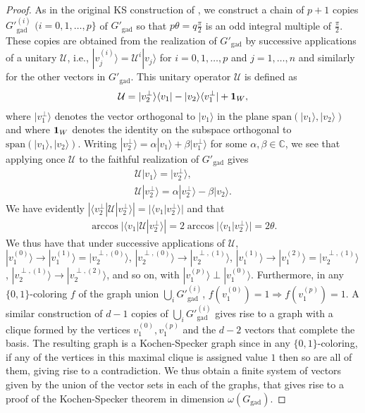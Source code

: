 \documentclass[twocolumn, a4paper, superscriptaddress,nofootinbib, accepted=2020-08-07, hyperref]{quantumarticle}
\def\textbf#1{{\bf #1}}
\begin{document}
\begin{proof}
	As in the original KS construction of \cite{KS}, we construct a chain of $p+1$ copies $G'^{(i)}_{\text{gad}}$ $(i=0,1,\ldots,p\}$ of $G'_{\text{gad}}$ so that $p \theta = q \frac{\pi}{2}$ is an odd integral multiple of $\frac{\pi}{2}$. These copies are obtained from the realization of $G'_{\text{gad}}$ by successive applications of a unitary $\mathcal{U}$, i.e., $|v_j^{(i)} \rangle = \mathcal{U}^{i} | v_j \rangle$ for $i=0,1,\ldots,p$ and $j=1,\ldots,n$ and similarly for the other vectors in $G'_{\text{gad}}$. This unitary operator $\mathcal{U}$ is defined as
	\begin{eqnarray}
	\mathcal{U} = |v_2^{\perp} \rangle \langle v_1 | - | v_2 \rangle \langle v_1^{\perp}| + \textbf{1}_W, 
	\end{eqnarray}
	where $| v_1^{\perp} \rangle$ denotes the vector orthogonal to $|v_1 \rangle$ in the plane $\text{span}(|v_1 \rangle, |v_2 \rangle)$ and where $\textbf{1}_W$ denotes the identity on the subspace orthogonal to $\text{span}(|v_1 \rangle, |v_2 \rangle)$. Writing $|v_2^{\perp} \rangle = \alpha | v_1 \rangle + \beta | v_1^{\perp} \rangle$ for some $\alpha, \beta \in \mathbb{C}$, we see that applying once $\mathcal{U}$ to the faithful realization of $G'_{\text{gad}}$ gives
	\begin{eqnarray}
	\mathcal{U} | v_1 \rangle = | v_2^{\perp} \rangle, \nonumber \\
	\mathcal{U} | v_2^{\perp} \rangle = \alpha | v_2^{\perp} \rangle - \beta | v_2 \rangle.
	\end{eqnarray}
	We have evidently $| \langle v_2^{\perp} | \mathcal{U} | v_2^{\perp} \rangle| = |\langle v_1 | v_2^{\perp} \rangle|$ and that 
	\begin{eqnarray}
	\arccos|\langle v_1 | \mathcal{U}| v_2^{\perp} \rangle| = 2 \arccos|\langle v_1 | v_2^{\perp} \rangle| = 2 \theta.
	\end{eqnarray}
We thus have that under successive applications of $\mathcal{U}$, $|v_1^{(0)}\rangle\rightarrow |v_1^{(1)}\rangle=|v_2^{\perp,(0)}\rangle$, $|v_2^{\perp,(0)}\rangle\rightarrow |v_2^{\perp,(1)}\rangle$, $|v_1^{(1)}\rangle\rightarrow |v_1^{(2)}\rangle=|v_2^{\perp,(1)}\rangle$, $|v_2^{\perp,(1)}\rangle\rightarrow |v_2^{\perp,(2)}\rangle$, and so on, with $|v_1^{(p)} \rangle \perp |v_1^{(0)} \rangle$. Furthermore, in any $\{0,1\}$-coloring $f$ of the graph union $\bigcup_{i} G'^{(i)}_{\text{gad}}$, $f(v_1^{(0)})=1 \Rightarrow f(v_1^{(p)}) = 1$. A similar construction of $d-1$ copies of $\bigcup_{i} G'^{(i)}_{\text{gad}}$ gives rise to a graph with a clique formed by the vertices $v_1^{(0)}, v_1^{(p)}$ and the $d-2$ vectors that complete the basis. The resulting graph is a Kochen-Specker graph since in any $\{0,1\}$-coloring, if any of the vertices in this maximal clique is assigned value $1$ then so are all of them, giving rise to a contradiction. We thus obtain a finite system of vectors given by the union of the vector sets in each of the graphs, that gives rise to a proof of the Kochen-Specker theorem in dimension $\omega(G_{\text{gad}})$.


\end{proof}
\end{document}
